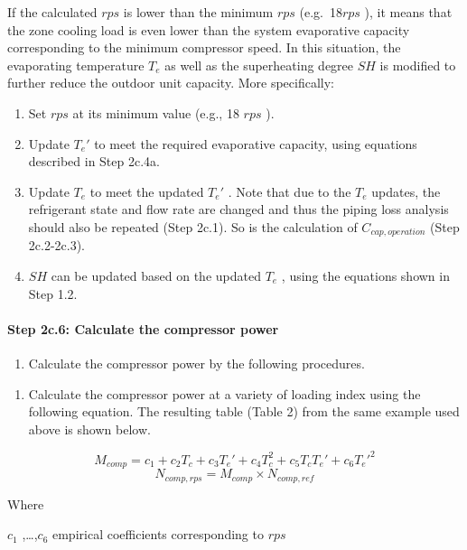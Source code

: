 If the calculated \(rps\) is lower than the minimum \(rps\) (e.g.~18\(rps\) ), it means that the zone cooling load is even lower than the system evaporative capacity corresponding to the minimum compressor speed. In this situation, the evaporating temperature \(T_e\) as well as the superheating degree \(SH\) is modified to further reduce the outdoor unit capacity. More specifically:

\begin{enumerate}
\def\labelenumi{\alph{enumi}.}
\item
  Set \(rps\) at its minimum value (e.g., 18 \(rps\) ).
\item
  Update \({T_e}'\) to meet the required evaporative capacity, using equations described in Step 2c.4a.
\item
  Update \(T_e\) to meet the updated \({T_e}'\) . Note that due to the \(T_e\) updates, the refrigerant state and flow rate are changed and thus the piping loss analysis should also be repeated (Step 2c.1). So is the calculation of \(C_{cap,operation}\) (Step 2c.2-2c.3).
\item
  \(SH\) can be updated based on the updated \(T_e\) , using the equations shown in Step 1.2.
\end{enumerate}

\paragraph{Step 2c.6: Calculate the compressor power}\label{step-2c.6-calculate-the-compressor-power}

\begin{enumerate}
\def\labelenumi{(\arabic{enumi})}
\tightlist
\item
  Calculate the compressor power by the following procedures. 
\end{enumerate}

\begin{enumerate}
\def\labelenumi{\alph{enumi}.}
\tightlist
\item
  Calculate the compressor power at a variety of loading index using the following equation. The resulting table (Table 2) from the same example used above is shown below.
\end{enumerate}

\[M_{comp} = c_1+c_2T_c+c_3{T_e}'+c_4T_c^2+c_5T_c{T_e}'+c_6{T_e}'^2\] \[N_{comp,rps} = M_{comp} \times N_{comp,ref}\]

Where

\(c_1\) ,\ldots{},\(c_6\) empirical coefficients corresponding to \(rps\)


